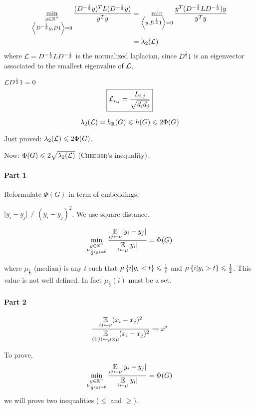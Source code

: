\[
    \begin{aligned}
        \min\limits_{\substack{y\in\mathbb{R}^n\\\left\langle D^{- \frac{1}{2}}y,D1 \right\rangle=0}} \frac{(D^{-\frac{1}{2}} y)^T L (D^{-\frac{1}{2}}y)}{y^Ty} &= \min\limits_{\left\langle y, D^{\frac{1}{2}}1 \right\rangle=0} \frac{y^T(D^{-\frac{1}{2}}LD^{-\frac{1}{2}})y}{y^T y}\\
        &= \lambda_2 (\mathcal{L})
    \end{aligned}
\]
where $\mathcal{L} = D^{-\frac{1}{2}} L D^{-\frac{1}{2}}$ is the normalized laplacian, since $D^{\frac{1}{2}}1$ is an eigenvector associated to the smallest eigenvalue of $\mathcal{L}$.

$\mathcal{L} D^{\frac{1}{2}} 1 =0$
\[
    \boxed{\mathcal{L}_{i,j} = \frac{L_{i,j}}{\sqrt{d_id_j}}}
\]

\[
    \lambda_2(\mathcal{L}) = h_{\mathbb{R}}(G) \leqslant h(G) \leqslant 2\Phi(G)
\]

Just proved: $\lambda_2(\mathcal{L}) \leqslant 2\Phi(G)$.

Now: $\Phi(G) \leqslant 2\sqrt{\lambda_2(\mathcal{L})}$ (\textsc{Cheeger}'s inequality).

\paragraph{Part 1}

Reformulate $\Phi(G)$ in term of embeddings.


$\lvert y_i -y_j \rvert \neq (y_i-y_j)^2$. We use square distance.

\[
    \min\limits_{\substack{y\in\mathbb{R}^n\\\mu_{\frac{1}{2}(y)=0}}} \frac{\underset{ij\leftarrow\nu}{\mathbb{E}}\lvert y_i-y_j\rvert}{\underset{i\leftarrow\mu}{\mathbb{E}}\lvert y_i \rvert} = \Phi(G)
\]

where $\mu_{\frac{1}{2}}$ (median) is any $t$ such that $\mu\left\{ i\vert y_i < t \right\} \leqslant \frac{1}{t}$ and $\mu\left\{ i\vert y_i >t \right\} \leqslant \frac{1}{2}$. This value is not well defined. In fact $\mu_{\frac{1}{2}}(i)$ must be a set.


\paragraph{Part 2}

\[
    \frac{\underset{ij\leftarrow\nu}{\mathbb{E}}(x_i-x_j)^2}{\underset{(i,j)\leftarrow\mu\times\mu}{\mathbb{E}}(x_i-x_j)^2} \rightsquigarrow x^*
\]



To prove,
\[
    \min\limits_{\substack{y\in\mathbb{R}^n\\\mu_{\frac{1}{2}(y)=0}}} \frac{\underset{ij\leftarrow\nu}{\mathbb{E}}\lvert y_i-y_j\rvert}{\underset{i\leftarrow\mu}{\mathbb{E}}\lvert y_i \rvert} = \Phi(G)
\]
we will prove two inequalities ($\leqslant$ and $\geqslant$).


